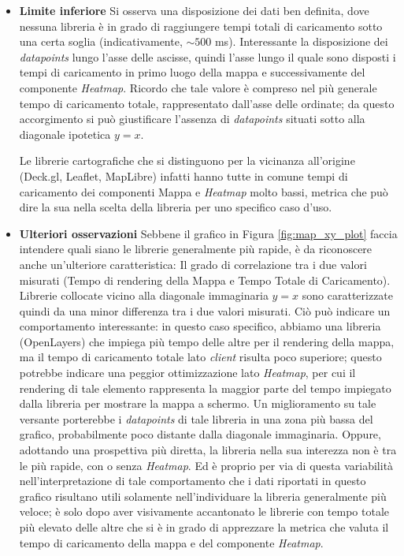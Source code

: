 \begin{itemize}
  \item \textbf{Limite inferiore} Si osserva una disposizione dei dati ben
    definita, dove nessuna libreria è in grado di raggiungere tempi totali di caricamento
    sotto una certa soglia (indicativamente, $\sim 500$ ms). Interessante la disposizione
    dei \textit{datapoints} lungo l'asse delle ascisse, quindi l'asse lungo il quale
    sono disposti i tempi di caricamento in primo luogo della mappa e successivamente
    del componente \textit{Heatmap}. Ricordo che tale valore è compreso nel più generale
    tempo di caricamento totale, rappresentato dall'asse delle ordinate; da questo
    accorgimento si può giustificare l'assenza di \textit{datapoints} situati
    sotto alla diagonale ipotetica $y=x$.

    Le librerie cartografiche che si distinguono per la vicinanza all'origine (Deck.gl,
    Leaflet, MapLibre) infatti hanno tutte in comune tempi di caricamento dei
    componenti Mappa e \textit{Heatmap} molto bassi, metrica che può dire la sua
    nella scelta della libreria per uno specifico caso d'uso.

  \item \textbf{Ulteriori osservazioni} Sebbene il grafico in Figura
    \ref{fig:map_xy_plot} faccia intendere quali siano le librerie generalmente
    più rapide, è da riconoscere anche un'ulteriore caratteristica: Il grado di
    correlazione tra i due valori misurati (Tempo di rendering della Mappa e Tempo
    Totale di Caricamento). Librerie collocate vicino alla diagonale immaginaria
    $y=x$ sono caratterizzate quindi da una minor differenza tra i due valori misurati.
    Ciò può indicare un comportamento interessante: in questo caso specifico,
    abbiamo una libreria (OpenLayers) che impiega più tempo delle altre per il
    rendering della mappa, ma il tempo di caricamento totale lato \textit{client}
    risulta poco superiore; questo potrebbe indicare una peggior ottimizzazione lato
    \textit{Heatmap}, per cui il rendering di tale elemento rappresenta la maggior
    parte del tempo impiegato dalla libreria per mostrare la mappa a schermo. Un
    miglioramento su tale versante porterebbe i \textit{datapoints} di tale libreria
    in una zona più bassa del grafico, probabilmente poco distante dalla
    diagonale immaginaria. Oppure, adottando una prospettiva più diretta, la libreria
    nella sua interezza non è tra le più rapide, con o senza \textit{Heatmap}.
    Ed è proprio per via di questa variabilità nell'interpretazione di tale
    comportamento che i dati riportati in questo grafico risultano utili
    solamente nell'individuare la libreria generalmente più veloce; è solo dopo aver
    visivamente accantonato le librerie con tempo totale più elevato delle altre
    che si è in grado di apprezzare la metrica che valuta il tempo di caricamento
    della mappa e del componente \textit{Heatmap}.
\end{itemize}

